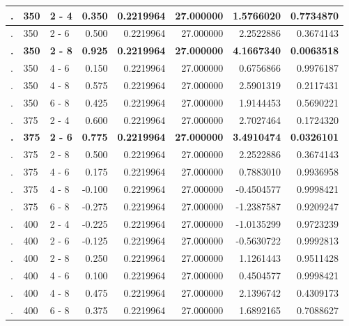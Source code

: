 \documentclass[12pt,]{article}
\begin{document}
\begin{table}[H]
\begin{tabular}{l|l|l|r|r|r|r|r}
. & 350 & 2 - 4 & 0.350 & 0.2219964 & 27.000000 & 1.5766020 & 0.7734870\\
\hline
. & 350 & 2 - 6 & 0.500 & 0.2219964 & 27.000000 & 2.2522886 & 0.3674143\\
\hline
\rowcolor[HTML]{EAFAF1}  \textbf{.} & \textbf{350} & \textbf{2 - 8} & \textbf{0.925} & \textbf{0.2219964} & \textbf{27.000000} & \textbf{4.1667340} & \textbf{0.0063518}\\
\hline
. & 350 & 4 - 6 & 0.150 & 0.2219964 & 27.000000 & 0.6756866 & 0.9976187\\
\hline
. & 350 & 4 - 8 & 0.575 & 0.2219964 & 27.000000 & 2.5901319 & 0.2117431\\
\hline
. & 350 & 6 - 8 & 0.425 & 0.2219964 & 27.000000 & 1.9144453 & 0.5690221\\
\hline
. & 375 & 2 - 4 & 0.600 & 0.2219964 & 27.000000 & 2.7027464 & 0.1724320\\
\hline
\rowcolor[HTML]{EAFAF1}  \textbf{.} & \textbf{375} & \textbf{2 - 6} & \textbf{0.775} & \textbf{0.2219964} & \textbf{27.000000} & \textbf{3.4910474} & \textbf{0.0326101}\\
\hline
. & 375 & 2 - 8 & 0.500 & 0.2219964 & 27.000000 & 2.2522886 & 0.3674143\\
\hline
. & 375 & 4 - 6 & 0.175 & 0.2219964 & 27.000000 & 0.7883010 & 0.9936958\\
\hline
. & 375 & 4 - 8 & -0.100 & 0.2219964 & 27.000000 & -0.4504577 & 0.9998421\\
\hline
. & 375 & 6 - 8 & -0.275 & 0.2219964 & 27.000000 & -1.2387587 & 0.9209247\\
\hline
. & 400 & 2 - 4 & -0.225 & 0.2219964 & 27.000000 & -1.0135299 & 0.9723239\\
\hline
. & 400 & 2 - 6 & -0.125 & 0.2219964 & 27.000000 & -0.5630722 & 0.9992813\\
\hline
. & 400 & 2 - 8 & 0.250 & 0.2219964 & 27.000000 & 1.1261443 & 0.9511428\\
\hline
. & 400 & 4 - 6 & 0.100 & 0.2219964 & 27.000000 & 0.4504577 & 0.9998421\\
\hline
. & 400 & 4 - 8 & 0.475 & 0.2219964 & 27.000000 & 2.1396742 & 0.4309173\\
\hline
. & 400 & 6 - 8 & 0.375 & 0.2219964 & 27.000000 & 1.6892165 & 0.7088627\\
\hline
\end{tabular}
\endgroup{}
\end{table}
\end{document}
